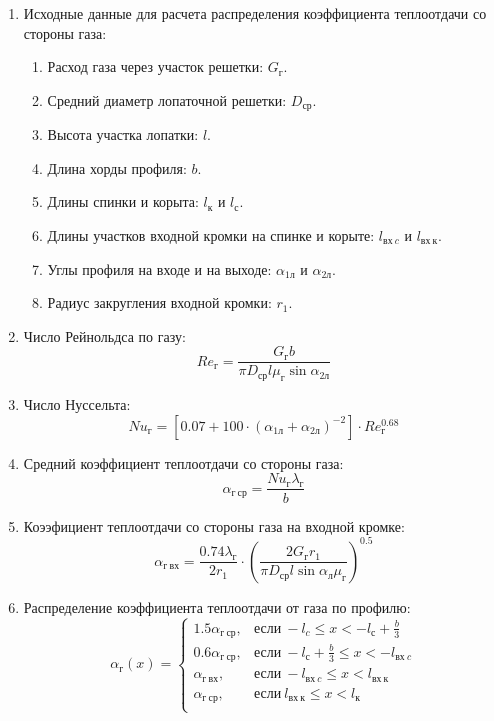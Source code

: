 \documentclass[a4paper,10pt]{article}
\begin{document}
    
        \begin{enumerate}

            \item Исходные данные для расчета распределения коэффициента теплоотдачи со стороны газа:
            \begin{enumerate}
                \item Расход газа через участок решетки: $G_г$.
                \item Средний диаметр лопаточной решетки: $D_{ср}$.
                \item Высота участка лопатки: $l$.
                \item Длина хорды профиля: $b$.
                \item Длины спинки и корыта: $l_к$ и $l_с$.
                \item Длины участков входной кромки на спинке и корыте: $l_{вх\ c}$ и $l_{вх\ к}$.
                \item Углы профиля на входе и на выходе: $\alpha_{1л}$ и $\alpha_{2л}$.
                \item Радиус закругления входной кромки: $r_1$.
            \end{enumerate}

            \item Число Рейнольдса по газу:
            \[
                Re_г = \frac{G_г b }{\pi D_{ср} l \mu_г \sin{\alpha_{2л}}}
            \]

            \item Число Нуссельта:
            \[
                Nu_г = \left[ 0.07 + 100 \cdot ( \alpha_{1л} + \alpha_{2л} )^{-2} \right] \cdot Re_г ^{0.68}
            \]

            \item Средний коэффициент теплоотдачи со стороны газа:
            \[
                \alpha_{г\ ср} = \frac{Nu_г \lambda_г}{b}
            \]

            \item Коээфициент теплоотдачи со стороны газа на входной кромке:
            \[
                \alpha_{г\ вх} = \frac{0.74 \lambda_г}{2 r_1} \cdot
                    \left(
                        \frac{2 G_г r_1}{\pi D_{ср} l \sin{\alpha_{л}} \mu_г}
                \right) ^ {0.5}
            \]

            \item Распределение коэффициента теплоотдачи от газа по профилю:
            \[
                \alpha_г(x) = \left\{
                    \begin{array}{lc}
                        1.5 \alpha_{г\ ср}, & \text{если}\ -l_c \leq x < -l_с + \frac{b}{3} \\
                        0.6 \alpha_{г\ ср}, & \text{если}\ -l_с + \frac{b}{3} \leq x < -l_{вх\ c} \\
                        \alpha_{г\ вх}, & \text{если}\ -l_{вх\ c} \leq x < l_{вх\ к} \\
                        \alpha_{г\ ср}, & \text{если}\ l_{вх\ к} \leq x < l_к \\
                    \end{array}
                \right.
            \]

        \end{enumerate}
\end{document}
